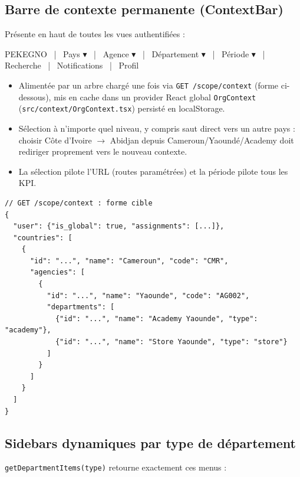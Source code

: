 \documentclass[11pt,a4paper]{article}
\begin{document}
\subsection{Barre de contexte permanente (ContextBar)}

Présente en haut de toutes les vues authentifiées :

\begin{center}\ttfamily
PEKEGNO ~|~ Pays $\blacktriangledown$ ~|~ Agence $\blacktriangledown$ ~|~ Département $\blacktriangledown$ ~|~ Période $\blacktriangledown$ ~|~ Recherche ~|~ Notifications ~|~ Profil
\end{center}

\begin{itemize}[nosep]
  \item Alimentée par un arbre chargé une fois via \verb|GET /scope/context| (forme ci-dessous), mis en cache dans un provider React global \verb|OrgContext| (\verb|src/context/OrgContext.tsx|) persisté en localStorage.
  \item Sélection à n'importe quel niveau, y compris saut direct vers un autre pays : choisir \og Côte d'Ivoire $\rightarrow$ Abidjan \fg{} depuis Cameroun/Yaoundé/Academy doit rediriger proprement vers le nouveau contexte.
  \item La sélection pilote l'URL (routes paramétrées) et la période pilote tous les KPI.
\end{itemize}

\begin{lstlisting}
// GET /scope/context : forme cible
{
  "user": {"is_global": true, "assignments": [...]},
  "countries": [
    {
      "id": "...", "name": "Cameroun", "code": "CMR",
      "agencies": [
        {
          "id": "...", "name": "Yaounde", "code": "AG002",
          "departments": [
            {"id": "...", "name": "Academy Yaounde", "type": "academy"},
            {"id": "...", "name": "Store Yaounde", "type": "store"}
          ]
        }
      ]
    }
  ]
}
\end{lstlisting}

\subsection{Sidebars dynamiques par type de département}

\verb|getDepartmentItems(type)| retourne exactement ces menus :
\end{document}
